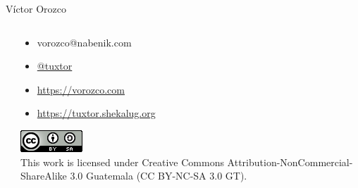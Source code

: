 \documentclass[aspectratio=169]{beamer}
\begin{document}
\begin{frame}{Víctor Orozco}
\begin{columns}[T]
\begin{column}[T]{4cm}
			\end{column}
			\begin{column}[T]{6cm} %
				\begin{itemize}
					\item vorozco@nabenik.com
					\item \href{https://twitter.com/tuxtor}{@tuxtor}
					\item \href{https://vorozco.com}{https://vorozco.com}
					\item \href{https://tuxtor.shekalug.org}{https://tuxtor.shekalug.org}
				\end{itemize}
				\begin{center}
					\includegraphics[width=0.1\linewidth]{Images/cclogo}
					\\
					This work is licensed under Creative Commons Attribution-NonCommercial-ShareAlike 3.0 Guatemala (CC BY-NC-SA 3.0 GT).
				\end{center}
			\end{column}
		\end{columns}
	\end{frame}
	
	
\end{document}
